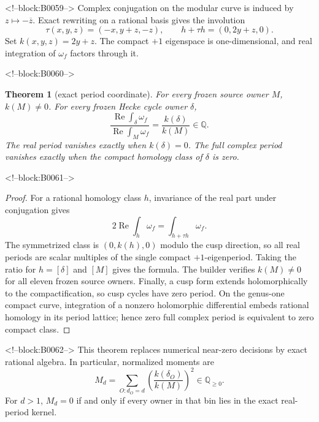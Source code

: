\documentclass[11pt]{article}
\newtheorem{theorem}{Theorem}[section]
\theoremstyle{definition}
\theoremstyle{remark}
\newcommand{\QQ}{\mathbb Q}
\begin{document}
<!--block:B0059-->
Complex conjugation on the modular curve is induced by $z\mapsto-\overline z$. Exact rewriting on a rational basis gives the involution
\[
\tau(x,y,z)=(-x,y+z,-z),
\qquad
h+\tau h=(0,2y+z,0).
\]
Set $k(x,y,z)=2y+z$. The compact $+1$ eigenspace is one-dimensional, and real integration of $\omega_f$ factors through it.

<!--block:B0060-->
\begin{theorem}[exact period coordinate]\label{thm:k}
For every frozen source owner $M$, $k(M)\neq0$. For every frozen Hecke cycle owner $\delta$,
\[
\frac{\operatorname{Re}\int_\delta\omega_f}
{\operatorname{Re}\int_M\omega_f}
=\frac{k(\delta)}{k(M)}\in\QQ.
\]
The real period vanishes exactly when $k(\delta)=0$. The full complex period vanishes exactly when the compact homology class of $\delta$ is zero.
\end{theorem}

<!--block:B0061-->
\begin{proof}
For a rational homology class $h$, invariance of the real part under conjugation gives
\[
2\operatorname{Re}\int_h\omega_f=\int_{h+\tau h}\omega_f.
\]
The symmetrized class is $(0,k(h),0)$ modulo the cusp direction, so all real periods are scalar multiples of the single compact $+1$-eigenperiod. Taking the ratio for $h=[\delta]$ and $[M]$ gives the formula. The builder verifies $k(M)\neq0$ for all eleven frozen source owners. Finally, a cusp form extends holomorphically to the compactification, so cusp cycles have zero period. On the genus-one compact curve, integration of a nonzero holomorphic differential embeds rational homology in its period lattice; hence zero full complex period is equivalent to zero compact class.
\end{proof}

<!--block:B0062-->
This theorem replaces numerical near-zero decisions by exact rational algebra. In particular, normalized moments are
\[
M_d=\sum_{O:d_O=d}\left(\frac{k(\delta_O)}{k(M)}\right)^2\in\QQ_{\geq0}.
\]
For $d>1$, $M_d=0$ if and only if every owner in that bin lies in the exact real-period kernel.
\end{document}
